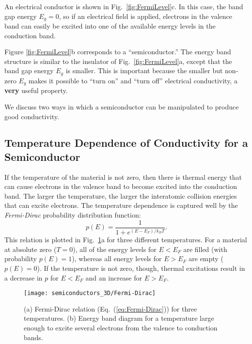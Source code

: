 An electrical conductor is shown in Fig.~\ref{fig:FermiLevel}c. In this
case, the band gap energy $E_g = 0$, so if an electrical field is applied, electrons
in the valence band can easily be excited into one of the available energy
levels in the conduction band.

Figure \ref{fig:FermiLevel}b corresponds to a ``semiconductor.'' The
energy band structure is similar to the insulator of Fig.~\ref{fig:FermiLevel}a,
except that the band gap energy $E_g$ is smaller. This is important because
the smaller but non-zero $E_g$ makes it possible to ``turn on'' and ``turn off''
electrical conductivity, a {\bf very} useful property.

We discuss two ways in which a semiconductor can be manipulated to
produce good conductivity.

\subsection{Temperature Dependence of Conductivity for a Semiconductor}

If the temperature of the material is not zero, then there is
thermal energy that can cause electrons in the valence band to 
become excited into the conduction band. The larger the temperature,
the larger the interatomic collision energies that can excite electrons.
The temperature dependence is captured well by the {\it Fermi-Dirac}
probability distribution function:
\begin{equation}
p(E) = \frac{1}{1+e^{(E-E_F)/k_BT}} .
\label{eq:Fermi-Dirac}
\end{equation}
This relation is plotted in Fig.~\ref{fig:Fermi-Dirac}a for three
different temperatures.  For a material at absolute zero ($T = 0$), all
of the energy levels for $E < E_F$ are filled (with probability $p(E) = 1$),
whereas all energy levels for $E > E_F$ are empty ($p(E) = 0$).
If the temperature is not zero, though, thermal excitations result in
a decrease in $p$ for $E < E_F$ and an increase for $E > E_F$.

\begin{figure}
\begin{center}
\texttt{[image: semiconductors\_3D/Fermi-Dirac]}
\end{center} 
\caption{(a) Fermi-Dirac relation (Eq.~(\ref{eq:Fermi-Dirac})) for
three temperatures. (b) Energy band diagram for a temperature large
enough to excite several electrons from the valence to conduction bands.} 
\label{fig:Fermi-Dirac} 
\end{figure}

